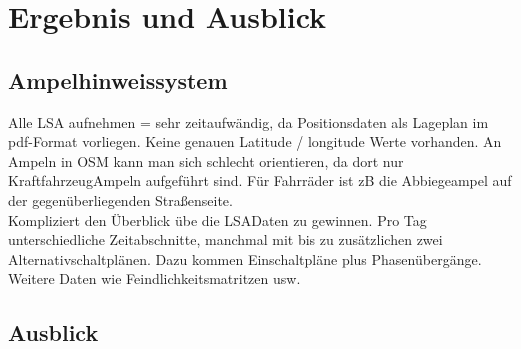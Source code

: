 \chapter{\label{chap:fazit}Ergebnis und Ausblick}
\section{Ampelhinweissystem}
Alle LSA aufnehmen = sehr zeitaufwändig, da Positionsdaten als Lageplan im pdf-Format vorliegen. Keine genauen Latitude / longitude Werte vorhanden. An Ampeln in OSM kann man sich schlecht orientieren, da dort nur KraftfahrzeugAmpeln aufgeführt sind. Für Fahrräder ist zB die Abbiegeampel auf der gegenüberliegenden Straßenseite. \\
Kompliziert den Überblick übe die LSADaten zu gewinnen. Pro Tag unterschiedliche Zeitabschnitte, manchmal mit bis zu zusätzlichen zwei Alternativschaltplänen. Dazu kommen Einschaltpläne plus Phasenübergänge. Weitere Daten wie Feindlichkeitsmatritzen usw.
\section{Ausblick}
